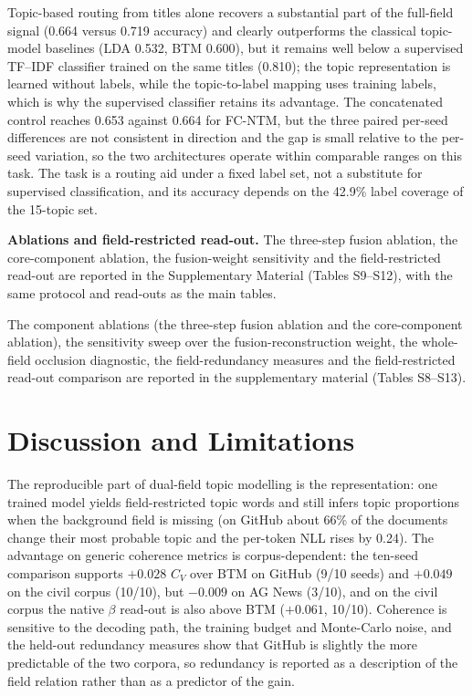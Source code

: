 \documentclass[Journal,letterpaper,NoLists]{ascelike-new}
\newcommand{\fcntm}{FC-NTM}
\begin{document}
Topic-based routing from titles alone recovers a substantial part of the full-field signal
(0.664 versus 0.719 accuracy) and clearly outperforms the classical topic-model baselines
(LDA 0.532, BTM 0.600), but it remains well below a supervised TF--IDF classifier trained on the
same titles (0.810); the topic representation is learned without labels, while the topic-to-label
mapping uses training labels, which is why the supervised classifier retains its advantage. The
concatenated control reaches 0.653 against 0.664 for \fcntm{}, but the three paired per-seed
differences are not consistent in direction and the gap is small relative to the per-seed
variation, so the two architectures operate within comparable ranges on this task. The task
is a routing aid under a fixed label set, not a substitute for supervised classification, and
its accuracy depends on the 42.9\% label coverage of the 15-topic set.

\noindent\textbf{Ablations and field-restricted read-out.} The three-step fusion
ablation, the core-component ablation, the fusion-weight sensitivity and the field-restricted
read-out are reported in the Supplementary Material (Tables S9--S12), with the same protocol and
read-outs as the main tables.

The component ablations (the three-step fusion ablation and the
core-component ablation), the sensitivity sweep over the fusion-reconstruction weight, the
whole-field occlusion diagnostic, the field-redundancy measures and the field-restricted read-out
comparison are reported in the supplementary material (Tables S8--S13).

\section{Discussion and Limitations}

The reproducible part of dual-field topic modelling is the representation: one trained model
yields field-restricted topic words and still infers topic proportions when the background field is
missing (on GitHub about 66\% of the documents change their most probable topic and the per-token
NLL rises by 0.24). The advantage on generic coherence metrics is corpus-dependent: the ten-seed
comparison supports $+0.028$ $C_V$ over BTM on GitHub (9/10 seeds) and $+0.049$ on the civil corpus
(10/10), but $-0.009$ on AG News (3/10), and on the civil corpus the native $\beta$ read-out is also
above BTM ($+0.061$, 10/10). Coherence is sensitive to the decoding path, the training budget and
Monte-Carlo noise, and the held-out redundancy measures show that GitHub is slightly the more
predictable of the two corpora, so redundancy is reported as a description of the field relation
rather than as a predictor of the gain.
\end{document}
